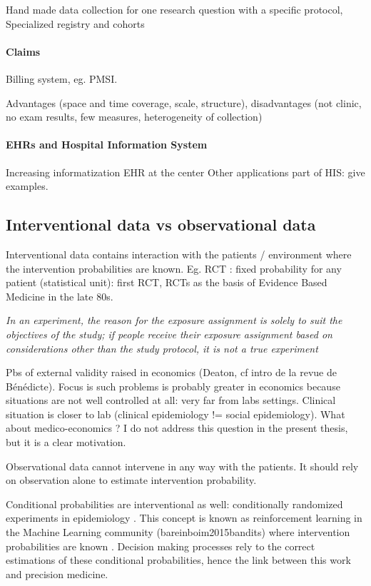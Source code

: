 \documentclass[french,12pt,twoside,a4paper]{book}
\begin{document}
Hand made data collection for one research question with a specific protocol,
Specialized registry and cohorts


\paragraph{Claims}

Billing system, eg. PMSI.

Advantages (space and time coverage, scale, structure), disadvantages (not clinic, no exam results, few measures, heterogeneity of collection)

\paragraph{EHRs and Hospital Information System}

Increasing informatization
EHR at the center
Other applications part of HIS: give examples.

\subsection{Interventional data vs observational
  data}\label{subsec:intro:interventional_vs_observational}


Interventional data contains interaction with the patients / environment where
the intervention probabilities are known. Eg. RCT : fixed probability for any
patient (statistical unit): first RCT, RCTs as the basis of Evidence Based
Medicine in the late 80s.

\textit{In an experiment, the reason for the exposure assignment is solely to
  suit the objectives of the study; if people receive their exposure assignment
  based on considerations other than the study protocol, it is not a true
  experiment} \citep{rothman2012epidemiology}

Pbs of external validity raised in economics (Deaton, cf intro de la revue de
Bénédicte). Focus is such problems is probably greater in economics because
situations are not well controlled at all: very far from labs settings. Clinical
situation is closer to lab (clinical epidemiology != social epidemiology). What
about medico-economics ? I do not address this question in the present thesis,
but it is a clear motivation.

%
Observational data cannot intervene in any way with the patients. It should rely
on observation alone to estimate intervention probability.

Conditional probabilities are interventional as well: conditionally randomized
experiments in epidemiology \citep{hernan2020causal}. This concept is known as
reinforcement learning in the Machine Learning community (bareinboim2015bandits)
where intervention probabilities are known \citep{bareinboim2015bandits}.
Decision making processes rely to the correct estimations of these
conditional probabilities, hence the link between this work and precision medicine.
\end{document}
